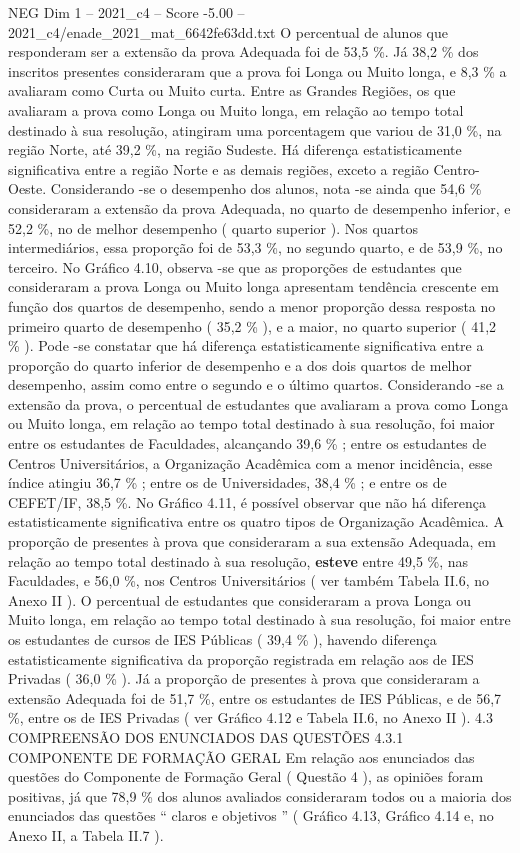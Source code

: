 \begin{textsample}{NEG Dim 1 – 2021\_c4 – Score -5.00 – 2021\_c4/enade\_2021\_mat\_6642fe63dd.txt}
O percentual de alunos que responderam ser a extensão da prova Adequada foi de 53,5 \%.
Já 38,2 \% dos inscritos presentes consideraram que a prova foi Longa ou Muito longa, e 8,3 \% a avaliaram como Curta ou Muito curta.
Entre as Grandes Regiões, os que avaliaram a prova como Longa ou Muito longa, em relação ao tempo total destinado à sua resolução, atingiram uma porcentagem que variou de 31,0 \%, na região Norte, até 39,2 \%, na região Sudeste.
Há diferença estatisticamente significativa entre a região Norte e as demais regiões, exceto a região Centro-Oeste.
Considerando -se o desempenho dos alunos, nota -se ainda que 54,6 \% consideraram a extensão da prova Adequada, no quarto de desempenho inferior, e 52,2 \%, no de melhor desempenho ( quarto superior ).
Nos quartos intermediários, essa proporção foi de 53,3 \%, no segundo quarto, e de 53,9 \%, no terceiro.
No Gráfico 4.10, observa -se que as proporções de estudantes que consideraram a prova Longa ou Muito longa apresentam tendência crescente em função dos quartos de desempenho, sendo a menor proporção dessa resposta no primeiro quarto de desempenho ( 35,2 \% ), e a maior, no quarto superior ( 41,2 \% ).
Pode -se constatar que há diferença estatisticamente significativa entre a proporção do quarto inferior de desempenho e a dos dois quartos de melhor desempenho, assim como entre o segundo e o último quartos.
Considerando -se a extensão da prova, o percentual de estudantes que avaliaram a prova como Longa ou Muito longa, em relação ao tempo total destinado à sua resolução, foi maior entre os estudantes de Faculdades, alcançando 39,6 \% ; entre os estudantes de Centros Universitários, a Organização Acadêmica com a menor incidência, esse índice atingiu 36,7 \% ; entre os de Universidades, 38,4 \% ; e entre os de CEFET/IF, 38,5 \%.
No Gráfico 4.11, é possível observar que não há diferença estatisticamente significativa entre os quatro tipos de Organização Acadêmica.
A proporção de presentes à prova que consideraram a sua extensão Adequada, em relação ao tempo total destinado à sua resolução, \textbf{esteve} entre 49,5 \%, nas Faculdades, e 56,0 \%, nos Centros Universitários ( ver também Tabela II.6, no Anexo II ).
O percentual de estudantes que consideraram a prova Longa ou Muito longa, em relação ao tempo total destinado à sua resolução, foi maior entre os estudantes de cursos de IES Públicas ( 39,4 \% ), havendo diferença estatisticamente significativa da proporção registrada em relação aos de IES Privadas ( 36,0 \% ).
Já a proporção de presentes à prova que consideraram a extensão Adequada foi de 51,7 \%, entre os estudantes de IES Públicas, e de 56,7 \%, entre os de IES Privadas ( ver Gráfico 4.12 e Tabela II.6, no Anexo II ). 4.3 COMPREENSÃO DOS ENUNCIADOS DAS QUESTÕES 4.3.1 COMPONENTE DE FORMAÇÃO GERAL Em relação aos enunciados das questões do Componente de Formação Geral ( Questão 4 ), as opiniões foram positivas, já que 78,9 \% dos alunos avaliados consideraram todos ou a maioria dos enunciados das questões “ claros e objetivos ” ( Gráfico 4.13, Gráfico 4.14 e, no Anexo II, a Tabela II.7 ).

\end{textsample}
